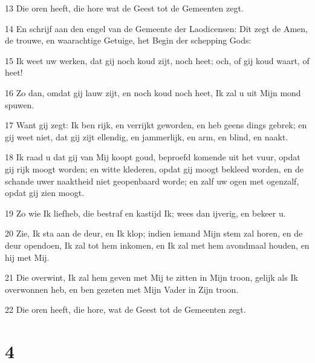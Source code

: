\par 13 Die oren heeft, die hore wat de Geest tot de Gemeenten zegt.
\par 14 En schrijf aan den engel van de Gemeente der Laodicensen: Dit zegt de Amen, de trouwe, en waarachtige Getuige, het Begin der schepping Gods:
\par 15 Ik weet uw werken, dat gij noch koud zijt, noch heet; och, of gij koud waart, of heet!
\par 16 Zo dan, omdat gij lauw zijt, en noch koud noch heet, Ik zal u uit Mijn mond spuwen.
\par 17 Want gij zegt: Ik ben rijk, en verrijkt geworden, en heb geens dings gebrek; en gij weet niet, dat gij zijt ellendig, en jammerlijk, en arm, en blind, en naakt.
\par 18 Ik raad u dat gij van Mij koopt goud, beproefd komende uit het vuur, opdat gij rijk moogt worden; en witte klederen, opdat gij moogt bekleed worden, en de schande uwer naaktheid niet geopenbaard worde; en zalf uw ogen met ogenzalf, opdat gij zien moogt.
\par 19 Zo wie Ik liefheb, die bestraf en kastijd Ik; wees dan ijverig, en bekeer u.
\par 20 Zie, Ik sta aan de deur, en Ik klop; indien iemand Mijn stem zal horen, en de deur opendoen, Ik zal tot hem inkomen, en Ik zal met hem avondmaal houden, en hij met Mij.
\par 21 Die overwint, Ik zal hem geven met Mij te zitten in Mijn troon, gelijk als Ik overwonnen heb, en ben gezeten met Mijn Vader in Zijn troon.
\par 22 Die oren heeft, die hore, wat de Geest tot de Gemeenten zegt.

\chapter{4}


